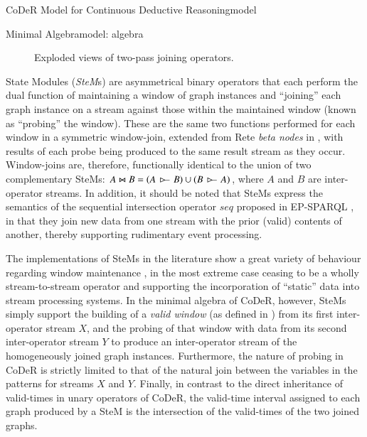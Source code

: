 \begin{nestedsection}{CoDeR Model for Continuous Deductive Reasoning}{model}
\begin{nestedsection}{Minimal Algebra}{model: algebra}
\begin{description}
\begin{figure}[t]
					\caption{Exploded views of two-pass joining operators.}
				\end{figure}
				State Modules (\emph{SteM}s) are asymmetrical binary operators that each perform the dual function of maintaining a window of graph instances and ``joining'' each graph instance on a stream against those within the maintained window (known as ``probing'' the window).
				These are the same two functions performed for each window in a symmetric window-join, extended from Rete \emph{beta nodes} in \citep{ReteDBMS}, with results of each probe being produced to the same result stream as they occur.
				Window-joins are, therefore, functionally identical to the union of two complementary SteMs:
				${A \Join B = \left( A\,\rstreamjoin\,B \right) \cup \left( B\,\rstreamjoin\,A \right)}$, where $A$ and $B$ are inter-operator streams.
				In addition, it should be noted that SteMs express the semantics of the sequential intersection operator ${seq}$ proposed in EP-SPARQL \citep{EP-SPARQL}, in that they join new data from one stream with the prior (valid) contents of another, thereby supporting rudimentary event processing.

				The implementations of SteMs in the literature show a great variety of behaviour regarding window maintenance \citep{SteMs}, in the most extreme case ceasing to be a wholly stream-to-stream operator and supporting the incorporation of ``static'' data into stream processing systems.
				In the minimal algebra of CoDeR, however, SteMs simply support the building of a \emph{valid window} (as defined in ) from its first inter-operator stream $X$, and the probing of that window with data from its second inter-operator stream $Y$ to produce an inter-operator stream of the homogeneously joined graph instances.
				Furthermore, the nature of probing in CoDeR is strictly limited to that of the natural join between the variables in the patterns for streams $X$ and $Y$.
				Finally, in contrast to the direct inheritance of valid-times in unary operators of CoDeR, the valid-time interval assigned to each graph produced by a SteM is the intersection of the valid-times of the two joined graphs.
		\end{description}


\end{nestedsection}
\end{nestedsection}
